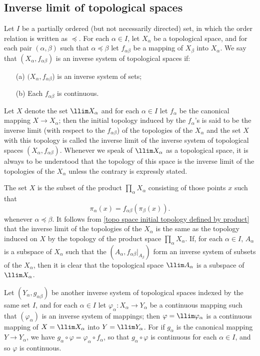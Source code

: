 \subsection{Inverse limit of topological spaces}
Let $I$ be a partially ordered (but not necessarily directed) set, in which the order relation is written as $\preceq$. For each $\alpha\in I$, let $X_\alpha$ be a topological space, and for each pair $(\alpha,\beta)$ such that $\alpha\preceq\beta$ let $f_{\alpha\beta}$ be a mapping of $X_\beta$ into $X_\alpha$. We say that $(X_\alpha,f_{\alpha\beta})$ is an inverse system of topological spaces if:
\begin{itemize}
\item[(a)] $(X_\alpha,f_{\alpha\beta}$) is an inverse system of sets;
\item[(b)] Each $f_{\alpha\beta}$ is continuous. 
\end{itemize} 
Let $X$ denote the set $\llim X_\alpha$ and for each $\alpha\in I$ let $f_\alpha$ be the canonical mapping $X\to X_\alpha$; then the initial topology induced by the $f_\alpha$'s is said to be the inverse limit (with respect to the $f_{\alpha\beta}$) of the topologies of the $X_\alpha$ and the set $X$ with this topology is called the inverse limit of the inverse system of topological spaces $(X_\alpha,f_{\alpha\beta})$. Whenever we speak of $\llim X_\alpha$ as a topological space, it is always to be understood that the topology of this space is the inverse limit of the topologies of the $X_\alpha$ unless the contrary is expressly stated.\par
The set $X$ is the subset of the product $\prod_{\alpha}X_\alpha$ consisting of those points $x$ such that
\[\pi_\alpha(x)=f_{\alpha\beta}(\pi_\beta(x)).\]
whenever $\alpha\preceq\beta$. It follows from \cref{topo space initial topology defined by product} that the inverse limit of the topologies of the $X_\alpha$ is the same as the topology induced on $X$ by the topology of the product space $\prod_\alpha X_\alpha$. If, for each $\alpha\in I$, $A_\alpha$ is a subspace of $X_\alpha$ such that the $(A_\alpha,f_{\alpha\beta}|_{A_\beta})$ form an inverse system of subsets of the $X_\alpha$, then it is clear that the topological space $\llim A_\alpha$ is a subspace of $\llim X_\alpha$.\par
Let $(Y_\alpha,g_{\alpha\beta})$ be another inverse system of topological spaces indexed by the same set $I$, and for each $\alpha\in I$ let $\varphi_\alpha:X_\alpha\to Y_\alpha$ be a continuous mapping such that $(\varphi_\alpha)$ is an inverse system of mappings; then $\varphi=\llim \varphi_\alpha$ is a continuous mapping of $X=\llim X_\alpha$ into $Y=\llim Y_\alpha$. For if $g_\alpha$ is the canonical mapping $Y\to Y_\alpha$, we have $g_\alpha\circ\varphi=\varphi_\alpha\circ f_\alpha$, so that $g_\alpha\circ\varphi$ is continuous for each $\alpha\in I$, and so $\varphi$ is continuous.\par
